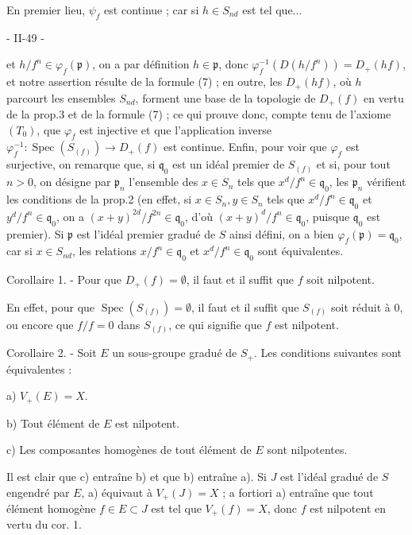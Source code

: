 En premier lieu, $\psi_f$ est continue ; car si $h \in S_{nd}$ est tel que...

\newpage


- II-49 -

et $h/f^n \in \varphi_f(\mathfrak{p})$, on a par définition $h \in \mathfrak{p}$, donc $\varphi_f^{-1}(D(h/f^n)) = D_+(hf)$, et notre assertion résulte de la formule (7) ; en outre, les $D_+(hf)$, où $h$ parcourt les ensembles $S_{nd}$, forment une base de la topologie de $D_+(f)$ en vertu de la prop.3 et de la formule (7) ; ce qui prouve donc, compte tenu de l'axiome $(T_0)$, que $\varphi_f$ est injective et que l'application inverse $\varphi_f^{-1} : \operatorname{Spec}(S_{(f)}) \to D_+(f)$ est continue. Enfin, pour voir que $\varphi_f$ est surjective, on remarque que, si $\mathfrak{q}_0$ est un idéal premier de $S_{(f)}$ et si, pour tout $n > 0$, on désigne par $\mathfrak{p}_n$ l'ensemble des $x \in S_n$ tels que $x^d/f^n \in \mathfrak{q}_0$, les $\mathfrak{p}_n$ vérifient les conditions de la prop.2 (en effet, si $x \in S_n, y \in S_n$ tels que $x^d/f^n \in \mathfrak{q}_0$ et $y^d/f^n \in \mathfrak{q}_0$, on a $(x+y)^{2d}/f^{2n} \in \mathfrak{q}_0$, d'où $(x+y)^d/f^n \in \mathfrak{q}_0$, puisque $\mathfrak{q}_0$ est premier). Si $\mathfrak{p}$ est l'idéal premier gradué de $S$ ainsi défini, on a bien $\varphi_f(\mathfrak{p}) = \mathfrak{q}_0$, car si $x \in S_{nd}$, les relations $x/f^n \in \mathfrak{q}_0$ et $x^d/f^n \in \mathfrak{q}_0$ sont équivalentes.


Corollaire 1. - Pour que $D_+(f) = \emptyset$, il faut et il suffit que $f$ soit nilpotent.

En effet, pour que $\operatorname{Spec}(S_{(f)}) = \emptyset$, il faut et il suffit que $S_{(f)}$ soit réduit à 0, ou encore que $f/f = 0$ dans $S_{(f)}$, ce qui signifie que $f$ est nilpotent.

Corollaire 2. - Soit $E$ un sous-groupe gradué de $S_+$. Les conditions suivantes sont équivalentes :

a) $V_+(E) = X$.

b) Tout élément de $E$ est nilpotent.

c) Les composantes homogènes de tout élément de $E$ sont nilpotentes.

Il est clair que c) entraîne b) et que b) entraîne a). Si $J$ est l'idéal gradué de $S$ engendré par $E$, a) équivaut à $V_+(J) = X$ ; a fortiori a) entraîne que tout élément homogène $f \in E \subset J$ est tel que $V_+(f) = X$, donc $f$ est nilpotent en vertu du cor. 1.

